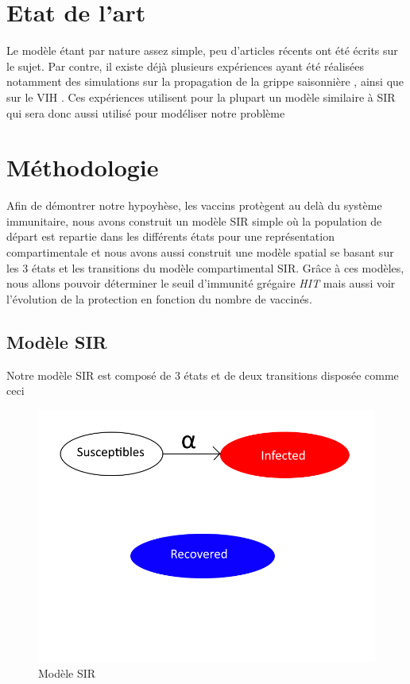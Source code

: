 \documentclass[journal, a4paper]{IEEEtran}
\begin{document}
\section{Etat de l'art}
	Le modèle étant par nature assez simple, peu d'articles récents ont été écrits sur le sujet. Par contre, il existe déjà plusieurs expériences ayant été réalisées notamment des simulations sur la propagation de la grippe saisonnière \cite{pandemic_influenza} \cite{influenza_HIT}, ainsi que sur le VIH \cite{VIH}. Ces expériences utilisent pour la plupart un modèle similaire à SIR qui sera donc aussi utilisé pour modéliser notre problème

\section{Méthodologie}\label{sec:met}
	Afin de démontrer notre hypoyhèse, les vaccins protègent au delà du système immunitaire, nous avons construit un modèle SIR simple où la population de départ est repartie dans les différents états pour une représentation compartimentale et nous avons aussi construit une modèle spatial se basant sur les 3 états et les transitions du modèle compartimental SIR.
	Grâce à ces modèles, nous allons pouvoir déterminer le seuil d'immunité grégaire \emph{HIT} mais aussi voir l'évolution de la protection en fonction du nombre de vaccinés.
	\subsection{Modèle SIR}
	Notre modèle SIR  est composé de 3 états et de deux transitions disposée comme ceci

	\begin{figure}
		\includegraphics[scale=0.4]{MySIR}
		\caption{Modèle SIR}
		\label{fig:MySIR}
	\end{figure}
\end{document}
